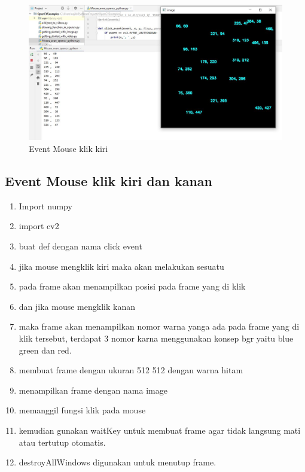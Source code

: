 \newpage
\begin{figure}[ht]
\centering
\includegraphics[scale=0.4]{figures/2,20,2.jpg}
\caption{Event Mouse klik kiri}
\label{contoh}
\end{figure}



\newpage
\subsection{Event Mouse klik kiri dan kanan}

\begin{enumerate}
	\item Import numpy
	\item import cv2
	\item buat def dengan nama click event
	\item jika mouse mengklik kiri maka akan melakukan sesuatu
	\item pada frame akan menampilkan posisi pada frame yang di klik
	\item dan jika mouse mengklik kanan
	\item maka frame akan menampilkan nomor warna yanga ada pada frame yang di klik tersebut, terdapat 3 nomor karna menggunakan konsep bgr yaitu blue green dan red.
	\item membuat frame dengan ukuran 512 512 dengan warna hitam
	\item menampilkan frame dengan nama image
	\item memanggil fungsi klik pada mouse
	\item kemudian gunakan waitKey untuk membuat frame agar tidak langsung mati atau tertutup otomatis.
	\item destroyAllWindows digunakan untuk menutup frame.
\end{enumerate}

